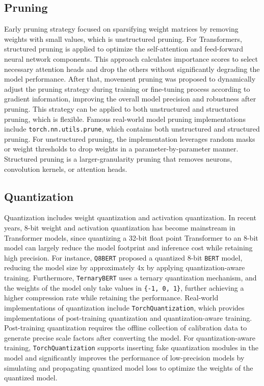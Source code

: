 \documentclass{article}
\begin{document}
    \subsection{Pruning}
    \hspace*{1em} Early pruning strategy focused on sparsifying weight matrices by removing weights with small values, which is unstructured pruning\cite{han2015learning}. For Transformers, structured pruning is applied to optimize the self-attention and feed-forward neural network components. This approach calculates importance scores to select necessary attention heads and drop the others\cite{michel2019sixteen} without significantly degrading the model performance. After that, movement pruning\cite{sanh2020movement} was proposed to dynamically adjust the pruning strategy during training or fine-tuning process according to gradient information, improving the overall model precision and robustness after pruning. This strategy can be applied to both unstructured and structured pruning, which is flexible. Famous real-world model pruning implementations include \texttt{torch.nn.utils.prune}, which contains both unstructured and structured pruning. For unstructured pruning, the implementation leverages random masks or weight thresholds to drop weights in a parameter-by-parameter manner. Structured pruning is a larger-granularity pruning that removes neurons, convolution kernels, or attention heads.

    \subsection{Quantization}
    \hspace*{1em} Quantization includes weight quantization and activation quantization. In recent years, 8-bit weight and activation quantization has become mainstream in Transformer models, since quantizing a 32-bit float point Transformer to an 8-bit model can largely reduce the model footprint and inference cost while retaining high precision. For instance, \texttt{Q8BERT}\cite{zafrir2019q8bert} proposed a quantized 8-bit \texttt{BERT} model, reducing the model size by approximately 4x by applying quantization-aware training. Furthermore, \texttt{TernaryBERT}\cite{zhang2020ternarybert} uses a ternary quantization mechanism, and the weights of the model only take values in \texttt{\{-1, 0, 1\}}, further achieving a higher compression rate while retaining the performance. Real-world implementations of quantization include \texttt{TorchQuantization}, which provides implementations of post-training quantization and quantization-aware training. Post-training quantization requires the offline collection of calibration data to generate precise scale factors after converting the model. For quantization-aware training, \texttt{TorchQuantization} supports inserting fake quantization modules in the model and significantly improves the performance of low-precision models by simulating and propagating quantized model loss to optimize the weights of the quantized model.
\end{document}
